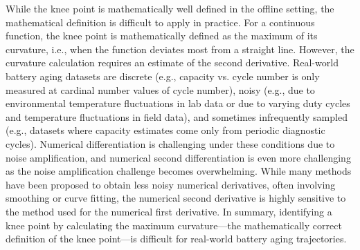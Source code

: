 \documentclass[journal=jpclcd,manuscript=article]{achemso}
\begin{document}
While the knee point is mathematically well defined in the offline setting, the mathematical definition is difficult to apply in practice. For a continuous function, the knee point is mathematically defined as the maximum of its curvature, i.e., when the function deviates most from a straight line.
However, the curvature calculation requires an estimate of the second derivative.
Real-world battery aging datasets are discrete (e.g., capacity vs. cycle number is only measured at cardinal number values of cycle number), noisy (e.g., due to environmental temperature fluctuations in lab data or due to varying duty cycles and temperature fluctuations in field data), and sometimes infrequently sampled (e.g., datasets where capacity estimates come only from periodic diagnostic cycles). 
Numerical differentiation is challenging under these conditions due to noise amplification, and numerical second differentiation is even more challenging as the noise amplification challenge becomes overwhelming.
While many methods have been proposed to obtain less noisy numerical derivatives\cite{ahnert_numerical_2007, van_breugel_numerical_2020}{}, often involving smoothing or curve fitting, the numerical second derivative is highly sensitive to the method used for the numerical first derivative.
In summary, identifying a knee point by calculating the maximum curvature---the mathematically correct definition of the knee point---is difficult for real-world battery aging trajectories.
\end{document}
